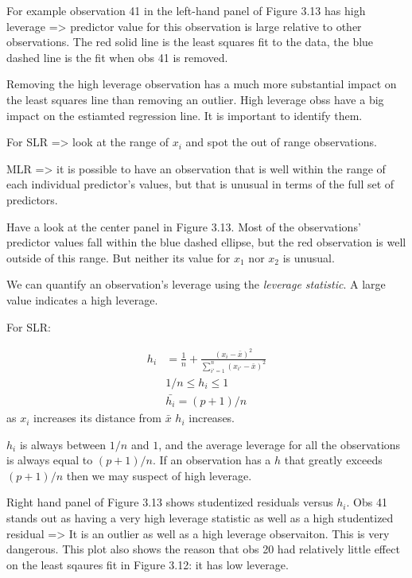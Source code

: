 \documentclass[
  letterpaper,
  DIV=11,
  numbers=noendperiod]{scrreprt}
\begin{document}
For example observation 41 in the left-hand panel of Figure 3.13 has
high leverage =\textgreater{} predictor value for this observation is
large relative to other observations. The red solid line is the least
squares fit to the data, the blue dashed line is the fit when obs 41 is
removed.

Removing the high leverage observation has a much more substantial
impact on the least squares line than removing an outlier. High leverage
obss have a big impact on the estiamted regression line. It is important
to identify them.

For SLR =\textgreater{} look at the range of \(x_i\) and spot the out of
range observations.

MLR =\textgreater{} it is possible to have an observation that is well
within the range of each individual predictor's values, but that is
unusual in terms of the full set of predictors.

Have a look at the center panel in Figure 3.13. Most of the
observations' predictor values fall within the blue dashed ellipse, but
the red observation is well outside of this range. But neither its value
for \(x_1\) nor \(x_2\) is unusual.

We can quantify an observation's leverage using the \emph{leverage
statistic}. A large value indicates a high leverage.

For SLR:

\[
\begin{align}
h_i &= \frac{1}{n} + \frac{(x_i - \bar{x})^2}{\sum_{i'=1}^n(x_{i'} - \bar{x})^2} \\
&1/n \leq h_i \leq 1 \\
&\bar{h_i} = (p+1)/n
\end{align}
\] as \(x_i\) increases its distance from \(\bar{x}\) \(h_i\) increases.

\(h_i\) is always between \(1/n\) and \(1\), and the average leverage
for all the observations is always equal to \((p+1)/n\). If an
observation has a \(h\) that greatly exceeds \((p+1)/n\) then we may
suspect of high leverage.

Right hand panel of Figure 3.13 shows studentized residuals versus
\(h_i\). Obs 41 stands out as having a very high leverage statistic as
well as a high studentized residual =\textgreater{} It is an outlier as
well as a high leverage observaiton. This is very dangerous. This plot
also shows the reason that obs 20 had relatively little effect on the
least sqaures fit in Figure 3.12: it has low leverage.
\end{document}
